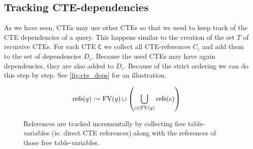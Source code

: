 
\subsection{Tracking CTE-dependencies}\label{tracking_cte_dependencies}
As we have seen, CTEs may use other CTEs so that we need to keep track of the CTE dependencies of a query. This happens similar to the creation of the set $T$ of recursive CTEs. For each CTE \texttt{C} we collect all CTE-references \texttt{$C_i$} and add them to the set of dependencies $D_c$. Because the used CTEs may have again dependencies, they are also added to $D_c$. Because of the strict ordering we can do this step by step. See \autoref{fig:cte_deps} for an illustration.

$$\operatorname{\text{refs}}(q) := \operatorname{\text{\rm FV}}(q) \cup \left(\bigcup_{c \in \operatorname{\text{\rm FV}}(q)} \operatorname{\text{refs}}(c)\right)$$

\begin{figure}[h!]
    \centering
    \caption{References are tracked incrementally by collecting free table-variables (ie. direct CTE references) along with the references of those free table-variables.}
    \label{fig:cte_deps}
\end{figure}

